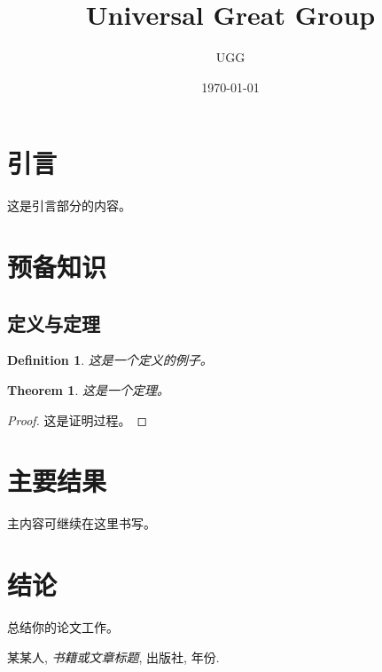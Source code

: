 \documentclass[12pt, a4paper]{article}
\title{\Huge\bfseries Universal Great Group}
\author{\Large UGG}
\date{\Large \today}
\newtheorem{theorem}{Theorem}[section]
\newtheorem{definition}{Definition}[section]
\begin{document}
\maketitle
\thispagestyle{empty} %
\newpage

\tableofcontents
\newpage

\section{引言}

这是引言部分的内容。

\section{预备知识}

\subsection{定义与定理}

\begin{definition}
这是一个定义的例子。
\end{definition}

\begin{theorem}
这是一个定理。
\end{theorem}

\begin{proof}
这是证明过程。
\end{proof}

\section{主要结果}

主内容可继续在这里书写。

\section{结论}

总结你的论文工作。

\newpage
\begin{thebibliography}{9}
 某某人, \emph{书籍或文章标题}, 出版社, 年份.
\end{thebibliography}
\end{document}
